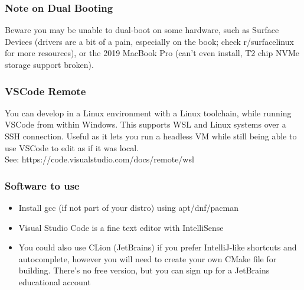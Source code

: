 \documentclass{beamer}
\begin{document}
\begin{frame}
  \frametitle{Note on Dual Booting}
    Beware you may be unable to dual-boot on some hardware, such as Surface Devices (drivers are a bit of a pain, especially on the book; check r/surfacelinux for more resources), or the 2019 MacBook Pro (can't even install, T2 chip NVMe storage support broken).
\end{frame}
\begin{frame}
  \frametitle{VSCode Remote}
  You can develop in a Linux environment with a Linux toolchain, while running VSCode from within Windows. This supports WSL and Linux systems over a SSH connection. Useful as it lets you run a headless VM while still being able to use VSCode to edit as if it was local.\\
  See: https://code.visualstudio.com/docs/remote/wsl
\end{frame}
\begin{frame}
  \frametitle{Software to use}
  \begin{itemize}
    \item Install gcc (if not part of your distro) using apt/dnf/pacman
    \item Visual Studio Code is a fine text editor with IntelliSense
    \item You could also use CLion (JetBrains) if you prefer IntelliJ-like shortcuts and autocomplete, however you will need to create your own CMake file for building. There's no free version, but you can sign up for a JetBrains educational account
  \end{itemize}
\end{frame}
\end{document}
